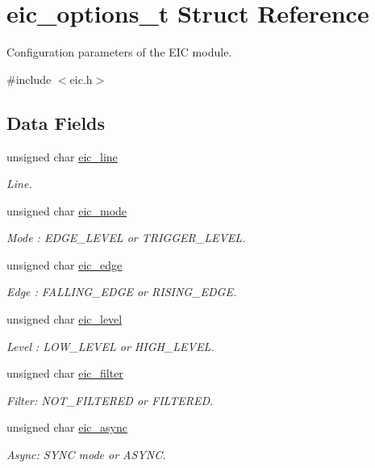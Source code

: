 \hypertarget{structeic__options__t}{
\section{eic\-\_\-options\-\_\-t \-Struct \-Reference}
\label{structeic__options__t}
}


\-Configuration parameters of the \-E\-I\-C module.  




{\ttfamily \#include $<$eic.\-h$>$}

\subsection*{\-Data \-Fields}
\begin{DoxyCompactItemize}
\item 
unsigned char \hyperlink{structeic__options__t_a90385bc0fbbea5039957b28b216a85f3}{eic\-\_\-line}
\begin{DoxyCompactList}\small\item\em \-Line. \end{DoxyCompactList}\item 
unsigned char \hyperlink{structeic__options__t_a82ae9d14d7e7b364542fb4b837a2c8de}{eic\-\_\-mode}
\begin{DoxyCompactList}\small\item\em \-Mode \-: \-E\-D\-G\-E\-\_\-\-L\-E\-V\-E\-L or \-T\-R\-I\-G\-G\-E\-R\-\_\-\-L\-E\-V\-E\-L. \end{DoxyCompactList}\item 
unsigned char \hyperlink{structeic__options__t_ae6338e7a428378643000dfecaa808ab3}{eic\-\_\-edge}
\begin{DoxyCompactList}\small\item\em \-Edge \-: \-F\-A\-L\-L\-I\-N\-G\-\_\-\-E\-D\-G\-E or \-R\-I\-S\-I\-N\-G\-\_\-\-E\-D\-G\-E. \end{DoxyCompactList}\item 
unsigned char \hyperlink{structeic__options__t_a15dc1e2b4f9aeb2f662553d63505ef6a}{eic\-\_\-level}
\begin{DoxyCompactList}\small\item\em \-Level \-: \-L\-O\-W\-\_\-\-L\-E\-V\-E\-L or \-H\-I\-G\-H\-\_\-\-L\-E\-V\-E\-L. \end{DoxyCompactList}\item 
unsigned char \hyperlink{structeic__options__t_ae1766941c964d8a36fa38110945d609f}{eic\-\_\-filter}
\begin{DoxyCompactList}\small\item\em \-Filter\-: \-N\-O\-T\-\_\-\-F\-I\-L\-T\-E\-R\-E\-D or \-F\-I\-L\-T\-E\-R\-E\-D. \end{DoxyCompactList}\item 
unsigned char \hyperlink{structeic__options__t_a578bdd7db1a8f7e9fe1d2460cb58fa44}{eic\-\_\-async}
\begin{DoxyCompactList}\small\item\em \-Async\-: \-S\-Y\-N\-C mode or \-A\-S\-Y\-N\-C. \end{DoxyCompactList}\end{DoxyCompactItemize}


